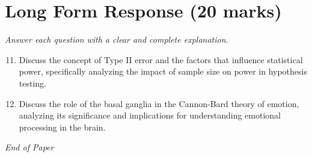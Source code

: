 \documentclass[12pt]{article}
\begin{document}
\section*{Long Form Response (20 marks)}
\textit{Answer each question with a clear and complete explanation.}
\begin{enumerate}[label=\arabic*.]
\setcounter{enumi}{10}
\item Discuss the concept of Type II error and the factors that influence statistical power, specifically analyzing the impact of sample size on power in hypothesis testing.
\item Discuss the role of the basal ganglia in the Cannon-Bard theory of emotion, analyzing its significance and implications for understanding emotional processing in the brain.
\end{enumerate}

\vfill
\noindent\textit{End of Paper}
\end{document}
